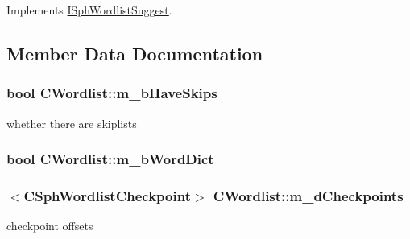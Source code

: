 Implements \hyperlink{classISphWordlistSuggest_a4ef3fd1eb857d09e17113400b3aedab1}{I\-Sph\-Wordlist\-Suggest}.



\subsection{Member Data Documentation}
\hypertarget{classCWordlist_ad4589e965e3c6bab74f7d03e69472228}{
\subsubsection[{m\-\_\-b\-Have\-Skips}]{\setlength{\rightskip}{0pt plus 5cm}bool C\-Wordlist\-::m\-\_\-b\-Have\-Skips}}\label{classCWordlist_ad4589e965e3c6bab74f7d03e69472228}


whether there are skiplists 

\hypertarget{classCWordlist_a5ccb70a09c3082e54de27feacb0f0607}{
\subsubsection[{m\-\_\-b\-Word\-Dict}]{\setlength{\rightskip}{0pt plus 5cm}bool C\-Wordlist\-::m\-\_\-b\-Word\-Dict\hspace{0.3cm}{\ttfamily [private]}}}\label{classCWordlist_a5ccb70a09c3082e54de27feacb0f0607}
\hypertarget{classCWordlist_a2f52708e559f3a2e5318dec6289c403e}{
\subsubsection[{m\-\_\-d\-Checkpoints}]{$<${\bf C\-Sph\-Wordlist\-Checkpoint}$>$ C\-Wordlist\-::m\-\_\-d\-Checkpoints}}\label{classCWordlist_a2f52708e559f3a2e5318dec6289c403e}


checkpoint offsets 

